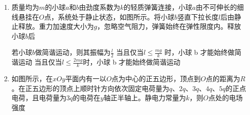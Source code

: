 \documentclass[\gkver]{gaokaozhenti}
\begin{document}
\begin{enumerate}
{	D．由 C 选项可知，仅适当增加 $n_{2}$，$I_{2}$ 增大，整个电路消耗的电功率 $P_{1}=P_{2}=U_{2}I_{2}$

	由于 $U_{2}$ 增大，故整个电路消耗的电功率变大，故 D 错误。

	故选 AC。
}

\item 
质量均为$ m $的小球$ a $和$ b $由劲度系数为$ k $的轻质弹簧连接，小球$ a $由不可伸长的细线悬挂在$ O $点，系统处于静止状态，如图所示。将小球$ b $竖直下拉长度$ l $后由静止释放。重力加速度大小为$ g $，忽略空气阻力，弹簧始终在弹性限度内。释放小球$ b $后  



{若小球$ b $做简谐运动，则其振幅为$\frac l2$}
{当且仅当$l\leqslant\frac{mg}k$ 时，小球 b 才能始终做简谐运动}
{当且仅当$l\leqslant\frac{2mg}k$时，小球 b 才能始终做简谐运动}



\item 
如图所示，在$ xOy $平面内有一以$ O $点为中心的正五边形，顶点到$ O $点的距离为$ R $。在正五边形的顶点上顺时针方向依次固定电荷量为$ q $、$ 2q $、$ 3q $、$ 4q $、$ 5q $的正点电荷，且电荷量为$ 3q $的电荷在$ y $轴正半轴上。静电力常量为$ k $，则$ O $点处的电场强度  




\end{enumerate}
\end{document}
